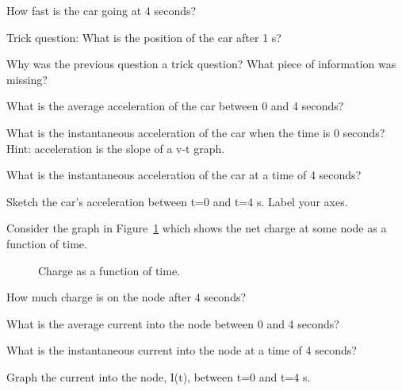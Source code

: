 \begin{alevel}
How fast is the car going at 4 seconds?
\end{alevel}

\begin{blevel}
Trick question: What is the position of the car after 1 s?
\end{blevel}

\begin{dlevel}
Why was the previous question a trick question? What piece of information was missing?
\end{dlevel}

\begin{blevel}
What is the average acceleration of the car between 0 and 4 seconds?
\end{blevel}

\begin{blevel}
What is the instantaneous acceleration of the car when the time is 0 seconds? Hint: acceleration is the slope of a v-t graph.
\end{blevel}

\begin{blevel}
What is the instantaneous acceleration of the car at a time of 4 seconds?
\end{blevel}
\begin{clevel}
Sketch the car's acceleration between t=0 and t=4 s. Label your axes.
\end{clevel}
\noindent
Consider the graph in Figure~\ref{F:2QT} which shows the net charge at some node as a function of time.
\par
\begin{figure}[H]
\begin{center}
\caption{Charge as a function of time.}
\label{F:2QT}
\end{center}
\end{figure}

\begin{alevel}
How much charge is on the node after 4 seconds?
\end{alevel}
\begin{blevel}
What is the average current into the node between 0 and 4 seconds?
\end{blevel}
\begin{blevel}
What is the instantaneous current into the node at a time of 4 seconds?
\end{blevel}
\begin{clevel}
Graph the current into the node, I(t), between t=0 and t=4 s.
\end{clevel}

